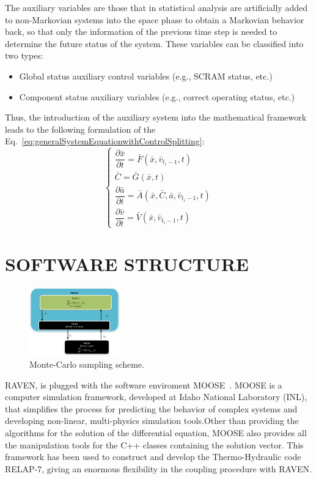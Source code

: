 \documentclass{anstrans}
\begin{document}
The auxiliary variables are those that in statistical analysis are artificially added to non-Markovian systems into the space phase to obtain a Markovian behavior back, so that only the information of the previous time step is needed to determine the future status of the system.
These variables can be classified into two types: 
\begin{itemize}
\item Global status auxiliary control variables (e.g., SCRAM status, etc.)
\item Component status auxiliary variables (e.g., correct operating status, etc.)
\end{itemize}
Thus, the introduction of the auxiliary system into the mathematical framework leads to the following formulation of the Eq.~\ref{eq:generalSystemEquationwithControlSplitting}:
\begin{equation}
\begin{cases} 
\dfrac{\partial \bar{x}}{\partial t} = \bar{F}(\bar{x},\bar{v}_{t_{i}-1},t) \\
\bar{C} = \bar{G}(\bar{x},t) \\ 
\dfrac{\partial \bar{a}}{\partial t} = \bar{A}(\bar{x},\bar{C},\bar{a},\bar{v}_{t_{i}-1},t) \\
\dfrac{\partial \bar{v}}{\partial t} = \bar{V}(\bar{x},\bar{v}_{t_{i}-1},t) 
\end{cases}
\label{eq:generalSystemEquationwithControlSplittingAndAux}
\end{equation}


\section{SOFTWARE STRUCTURE}
\begin{figure}
\centering
\includegraphics[width=0.35\textwidth]{figures/ControlSystemSoftwareLayout.pdf}
\caption{Monte-Carlo sampling scheme.}
\label{fig:ControlSoftwareLayout}
\end{figure}
RAVEN, is plugged with the software enviroment MOOSE~\cite{MOOSE}. MOOSE is a computer simulation framework,  developed at Idaho National Laboratory (INL), that simplifies the process for predicting the behavior of complex systems and developing non-linear, multi-physics simulation tools.Other than providing the algorithms for the solution of the differential equation, MOOSE also provides all the manipulation tools for the C++ classes containing the solution vector. This framework has been used to construct and develop the Thermo-Hydraulic code RELAP-7, giving an enormous flexibility in the coupling procedure with RAVEN. 
\end{document}
